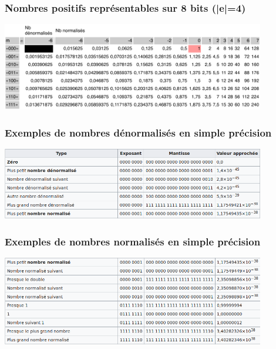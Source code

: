 \documentclass{beamer}
\begin{document}
\begin{frame}
  \frametitle{Nombres positifs représentables sur 8 bits
    (|e|=4)}
  \vspace{-1cm}
\hspace{-1cm}\includegraphics[width=11.5cm]{img/flottants_sur_8_bits.pdf}

\end{frame}
  
\begin{frame}
\frametitle{Exemples de nombres dénormalisés en simple précision}
\includegraphics[width=11.5cm]{img/simple_precision_denorm.png}

\end{frame}

\begin{frame}
\frametitle{Exemples de nombres normalisés en simple précision}
\includegraphics[width=11.5cm]{img/simple_precision.png}

\end{frame}
\end{document}
